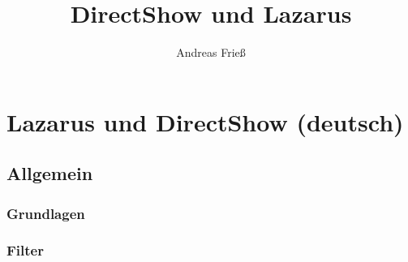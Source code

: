\documentclass[10pt,
a4paper,
oneside,
titlepage,
bibtotocnumbered,	  %
liststotocnumbered]{scrbook}
\author{Andreas Frieß}
\title{DirectShow und Lazarus}
\begin{document}
\setcounter{tocdepth}{3} %
\pagestyle{empty} %
\maketitle 						%
%	
\tableofcontents			%

\newpage
\pagestyle{headings} %

\part[Lazarus und DirectShow]{Lazarus und DirectShow (deutsch)}
\chapter{Allgemein}
\section{Grundlagen}

\section{Filter}


\listoffigures
\listoftables

\printnoidxglossaries
\end{document}
